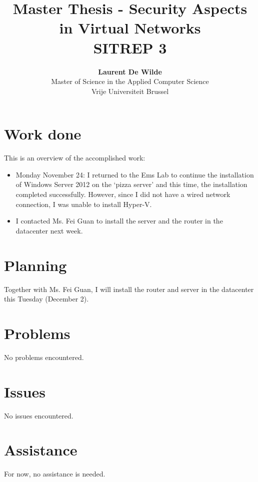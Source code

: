 \documentclass[11pt, a4paper]{article}
\title{Master Thesis -  Security Aspects in Virtual Networks\\ \textbf{SITREP 3}}
\author{\textbf{Laurent De Wilde} \\ Master of Science in the Applied Computer Science \\ Vrije Universiteit Brussel}
\begin{document}
\maketitle

\section{Work done}

This is an overview of the accomplished work:
\begin{itemize}
\item Monday November 24: I returned to the Ems Lab to continue the installation of Windows Server 2012 on the `pizza server' and this time,  the installation completed successfully. However, since I did not have a wired network connection, I was unable to install Hyper-V.
\item I contacted Ms. Fei Guan to install the server and the router in the datacenter next week.
\end{itemize}

\section{Planning}

Together with Ms. Fei Guan, I will install the router and server in the datacenter this Tuesday (December 2).

\section{Problems}

No problems encountered.

\section{Issues}

No issues encountered.

\section{Assistance}

For now, no assistance is needed.
\end{document}

